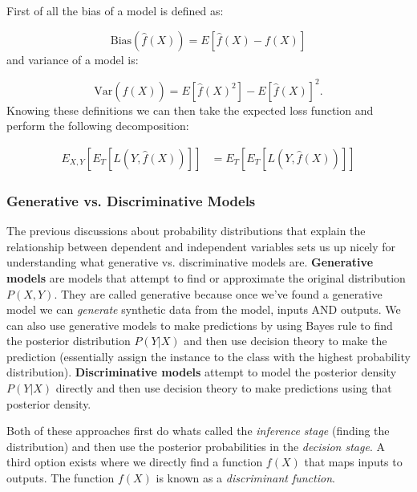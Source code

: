 \documentclass[paper=a4, fontsize=11pt]{scrartcl} %
\numberwithin{equation}{section} %
\numberwithin{figure}{section} %
\numberwithin{table}{section} %
\begin{document}
First of all the bias of a model is defined as:

\begin{equation}
\text{Bias}\left(\hat{f}(X)\right) = E \left[\hat{f}(X) - f(X)\right]
\end{equation}
and variance of a model is:

\begin{equation}
\text{Var}\left(\hat{f}(X)\right) = E \left[\hat{f}(X)^2\right] - E \left[\hat{f}(X)\right]^2. 
\end{equation}
Knowing these definitions we can then take the expected loss function and perform the following decomposition:

\begin{equation}
\begin{split}
E_{X,Y}[E_{T}[L(Y, \hat{f}(X))]] & = E_{T}[E_{T}[L(Y, \hat{f}(X))]]
\end{split}
\end{equation}



\subsubsection{Generative vs. Discriminative Models}

The previous discussions about probability distributions that explain the relationship between dependent and independent variables sets us up nicely for understanding what generative vs. discriminative models are. \textbf{Generative models} are models that attempt to find or approximate the original distribution $P(X,Y)$. They are called generative because once we've found a generative model we can \emph{generate} synthetic data from the model, inputs AND outputs. We can also use generative models to make predictions by using Bayes rule to find the posterior distribution $P(Y|X)$ and then use decision theory to make the prediction (essentially assign the instance to the class with the highest probability distribution). \textbf{Discriminative models} attempt to model the posterior density $P(Y|X)$ directly and then use decision theory to make predictions using that posterior density. 

Both of these approaches first do whats called the \emph{inference stage} (finding the distribution) and then use the posterior probabilities in the \emph{decision stage}. A third option exists where we directly find a function $f(X)$ that maps inputs to outputs. The function $f(X)$ is known as a \emph{discriminant function}.
\end{document}
